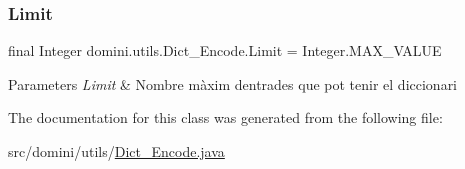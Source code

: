 \subsubsection{\texorpdfstring{Limit}{Limit}}
{\footnotesize\ttfamily final Integer domini.\+utils.\+Dict\+\_\+\+Encode.\+Limit = Integer.\+M\+A\+X\+\_\+\+V\+A\+L\+UE\hspace{0.3cm}{\ttfamily [static]}}


\begin{DoxyParams}{Parameters}
{\em Limit} & Nombre màxim d\textquotesingle{}entrades que pot tenir el diccionari \\
\hline
\end{DoxyParams}


The documentation for this class was generated from the following file\+:\begin{DoxyCompactItemize}
\item 
src/domini/utils/\hyperlink{Dict__Encode_8java}{Dict\+\_\+\+Encode.\+java}\end{DoxyCompactItemize}
